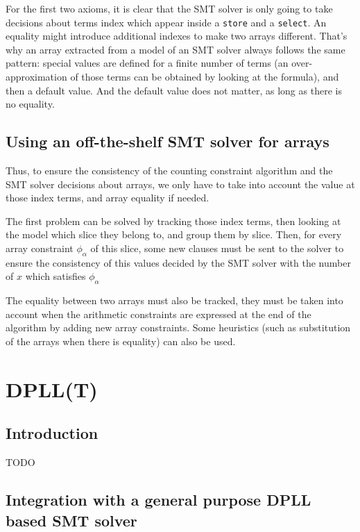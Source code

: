 \documentclass[]{article}
\begin{document}
For the first two axioms, it is clear that the SMT solver is only going
to take decisions about terms index which appear inside a \texttt{store}
and a \texttt{select}. An equality might introduce additional indexes to
make two arrays different. That's why an array extracted from a model of
an SMT solver always follows the same pattern: special values are
defined for a finite number of terms (an over-approximation of those
terms can be obtained by looking at the formula), and then a default
value. And the default value does not matter, as long as there is no
equality.

\subsection{Using an off-the-shelf SMT solver for
arrays}\label{using-an-off-the-shelf-smt-solver-for-arrays}

Thus, to ensure the consistency of the counting constraint algorithm and
the SMT solver decisions about arrays, we only have to take into account
the value at those index terms, and array equality if needed.

The first problem can be solved by tracking those index terms, then
looking at the model which slice they belong to, and group them by
slice. Then, for every array constraint $\phi_\alpha$ of this slice,
some new clauses must be sent to the solver to ensure the consistency of
this values decided by the SMT solver with the number of $x$ which
satisfies $\phi_\alpha$

The equality between two arrays must also be tracked, they must be taken
into account when the arithmetic constraints are expressed at the end of
the algorithm by adding new array constraints. Some heuristics (such as
substitution of the arrays when there is equality) can also be used.

\section{DPLL(T)}\label{dpllt}

\subsection{Introduction}\label{introduction-1}

TODO

\subsection{Integration with a general purpose DPLL based SMT
solver}\label{integration-with-a-general-purpose-dpll-based-smt-solver}
\end{document}
